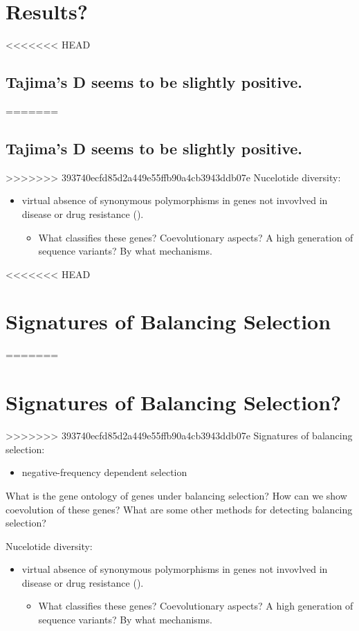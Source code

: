 \documentclass[11pt]{article}
\begin{document}
\section{Results?}
<<<<<<< HEAD
\label{sec:org49330f4}
\subsection{Tajima's D seems to be slightly positive.}
\label{sec:org224d229}
=======
\label{sec:org45d3d53}
\subsection{Tajima's D seems to be slightly positive.}
\label{sec:org1fd1620}
>>>>>>> 393740ecfd85d2a449e55ffb90a4cb3943ddb07e
Nucelotide diversity:
\begin{itemize}
\item virtual absence of synonymous polymorphisms in genes not invovlved in disease or drug resistance (\cite{rich-2000-popul-struc}).
\begin{itemize}
\item What classifies these genes? Coevolutionary aspects? A high generation of sequence variants? By what mechanisms.
\end{itemize}
\end{itemize}

<<<<<<< HEAD
\section{Signatures of Balancing Selection}
\label{sec:orgd5735c2}
=======
\section{Signatures of Balancing Selection?}
\label{sec:orgb42e4da}
>>>>>>> 393740ecfd85d2a449e55ffb90a4cb3943ddb07e
Signatures of balancing selection:
\begin{itemize}
\item negative-frequency dependent selection
\end{itemize}

What is the gene ontology of genes under balancing selection? How can we show coevolution of these genes? What are some other methods for detecting balancing selection?

Nucelotide diversity:
\begin{itemize}
\item virtual absence of synonymous polymorphisms in genes not invovlved in disease or drug resistance (\cite{rich-2000-popul-struc}).
\begin{itemize}
\item What classifies these genes? Coevolutionary aspects? A high generation of sequence variants? By what mechanisms.
\end{itemize}
\end{itemize}
\end{document}
